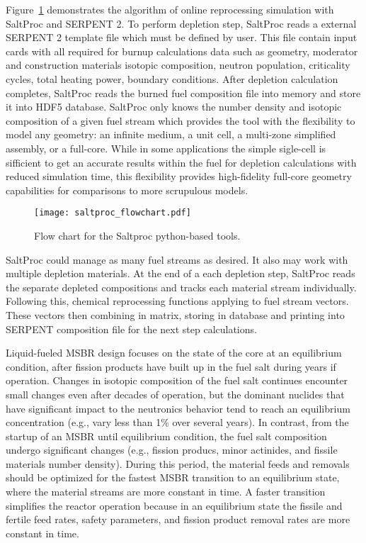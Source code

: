 Figure~\ref{fig:saltproc_flow} demonstrates the algorithm of online reprocessing simulation with SaltProc and SERPENT 2. To perform depletion step, SaltProc reads a external SERPENT 2 template file which must be defined by user. This file contain input cards with all required for burnup calculations data such as geometry, moderator and construction materials isotopic composition, neutron population, criticality cycles, total heating power, boundary conditions. After depletion calculation completes, SaltProc reads the burned fuel composition file into memory and store it into HDF5 database. SaltProc only knows the number density and isotopic composition of a given fuel stream which provides the tool with the flexibility to model any geometry: an infinite medium, a unit cell, a multi-zone simplified assembly, or a full-core. While in some applications the simple sigle-cell is sifficient to get an accurate results within the fuel for depletion calculations with reduced simulation time, this flexibility provides high-fidelity full-core geometry capabilities for comparisons to more scrupulous models.

\begin{figure}[htp!] %
  \centering
  \vspace{-0.3em}
  \texttt{[image: saltproc\_flowchart.pdf]}
  \caption{Flow chart for the Saltproc python-based tools.}
  \vspace{-0.6em}
  \label{fig:saltproc_flow}
\end{figure}
\FloatBarrier

SaltProc could manage as many fuel streams as desired. It also may work with multiple depletion materials. At the end of a each depletion step, SaltProc reads the separate depleted compositions and tracks each material stream individually. Following this, chemical reprocessing functions applying to fuel stream vectors. These vectors then combining in matrix, storing in database and printing into SERPENT composition file for the next step calculations.

Liquid-fueled \gls{MSBR} design focuses on the state of the core at an equilibrium condition, after fission products have built up in the fuel salt during years if operation. Changes in isotopic composition of the fuel salt continues encounter small changes even after decades of operation, but the dominant nuclides that have significant impact to the neutronics behavior tend to reach an equilibrium concentration (e.g., vary less than 1\% over several years). In contrast, from the startup of an \gls{MSBR} until equilibrium condition, the fuel salt composition undergo significant changes (e.g., fission producs, minor actinides, and fissile materials number density). During this period, the material feeds and removals should be optimized for the fastest \gls{MSBR} transition to an equilibrium state, where the material streams are more constant in time. A faster transition simplifies the reactor operation because in an equilibrium state the fissile and fertile feed rates, safety parameters, and fission product removal rates are more constant in time.

